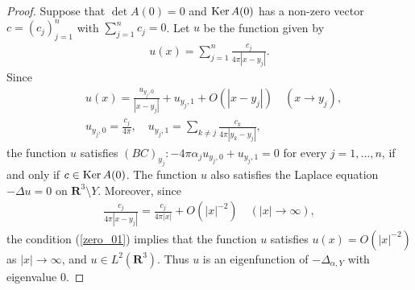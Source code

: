 \documentclass[12pt,a4paper]{article}
\def\Ker{\mathop{\rm Ker}\nolimits}
\begin{document}
\begin{proof}
Suppose that $\det A(0)=0$ and $\Ker A(0)$ has a non-zero vector
$c=(c_j)_{j=1}^n$ with $\sum_{j=1}^n c_j=0$.
Let $u$ be the function given by
\begin{align*}
 u(x)=\sum_{j=1}^n
\frac{c_j}{4\pi|x-y_j|}.
\end{align*}
Since
\begin{align*}
 &u(x)=\frac{u_{y_j,0}}{|x-y_j|}+u_{y_j,1}+O(|x-y_j|)\quad (x\to y_j),\\
&u_{y_j,0}=\frac{c_j}{4\pi},\quad
u_{y_j,1}=\sum_{k\not=j}\frac{c_k}{4\pi|y_k-y_j|},
\end{align*}
the function $u$ satisfies 
$(BC)_{y_j}: -4\pi \alpha_j u_{y_j,0}+u_{y_j,1}=0$
for every $j=1,\ldots,n$,
if and only if $c\in \Ker A(0)$.
The function $u$ also satisfies 
the Laplace equation $-\Delta u=0$ on $\mathbf{R}^3\setminus Y$.
Moreover, since
\begin{align*}
\frac{c_j}{4\pi|x-y_j|}=\frac{c_j}{4\pi|x|}+O(|x|^{-2}) \quad(|x|\rightarrow \infty),
\end{align*}
the condition (\ref{zero_01}) implies that
the function $u$ satisfies $u(x)=O(|x|^{-2})$ as $|x|\rightarrow \infty$,
and $u\in L^2(\mathbf{R}^3)$.
Thus $u$ is an eigenfunction of $-\Delta_{\alpha,Y}$
with eigenvalue $0$.

\end{proof}
\end{document}
